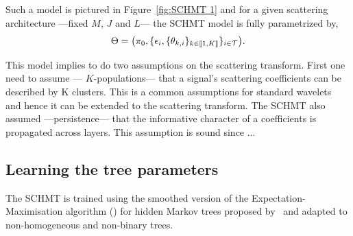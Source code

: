 \documentclass{article}
\begin{document}
    Such a model is pictured in Figure~\ref{fig:SCHMT 1} and for a given scattering architecture ---\ie fixed $M$, $J$ and $L$--- the SCHMT model is fully parametrized by,
    \begin{equation}
      \Theta = \big(\pi_{0}, \{ \epsilon_{i}, \{ \theta_{k,i} \}_{k\in\llbracket1,K\rrbracket} \}_{i\in\mathcal{T}}\big).
      \label{eq:SCHMT - parameters}
    \end{equation}
    
%     
    This model implies to do two assumptions on the scattering transform. First one need to assume --- $K$-populations--- that a signal’s scattering coefficients can be described by K clusters. This is a common assumptions for standard wavelets~\citep{kingsbury2001complex} and hence it can be extended to the scattering transform. The SCHMT also assumed ---persistence--- that the informative character of a coefficients is propagated across layers. This assumption is sound since ...

  \subsection{Learning the tree parameters}
    \label{subsec:SCHMT/Learning}    

    The SCHMT is trained using the smoothed version of the Expectation-Maximisation algorithm (\cite{someone}) for hidden Markov trees proposed by~\citep{Durand} and adapted to non-homogeneous and non-binary trees.
    
\end{document}
